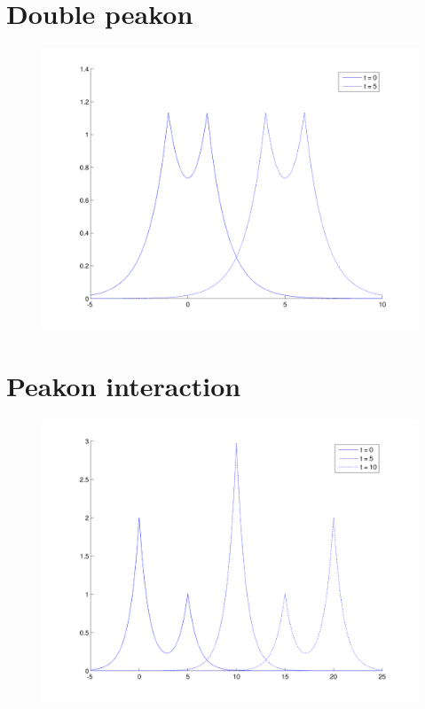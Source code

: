 \documentclass{beamer}
\begin{document}
\section{Double peakon}
\begin{frame}

\begin{figure}
\includegraphics[width=0.8\linewidth]{gfx/doublepeakon}
\end{figure}

\end{frame}


\section{Peakon interaction}
\begin{frame}

\begin{figure}
\includegraphics[width=0.8\linewidth]{gfx/peakonovertake}
\end{figure}

\end{frame}
\end{document}
